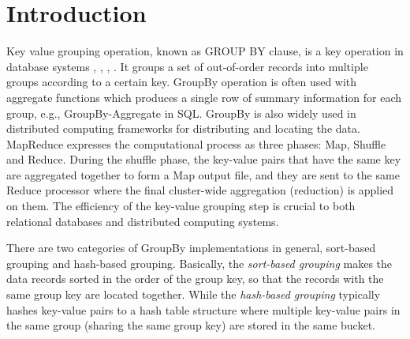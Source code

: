\section{Introduction}

Key value grouping operation, known as GROUP BY clause, is a key operation in database systems \cite{gray1997data}, \cite{stephens2005oracle}, \cite{mysql2009mysql}, \cite{momjian2001postgresql}. It groups a set of out-of-order records into multiple groups according to a certain key. GroupBy operation is often used with aggregate functions which produces a single row of summary information for each group, e.g., GroupBy-Aggregate in SQL. GroupBy is also widely used in distributed computing frameworks for distributing and locating the data. MapReduce \cite{dean2008mapreduce} expresses the computational process as three phases: Map, Shuffle and Reduce. During the shuffle phase, the key-value pairs that have the same key are aggregated together to form a Map output file, and they are sent to the same Reduce processor where the final cluster-wide aggregation (reduction) is applied on them. The efficiency of the key-value grouping step is crucial to both relational databases and distributed computing systems.



There are two categories of GroupBy implementations in general, sort-based grouping and hash-based grouping. Basically, the \emph{sort-based grouping} makes the data records sorted in the order of the group key, so that the records with the same group key are located together. While the \emph{hash-based grouping} typically hashes key-value pairs to a hash table structure where multiple key-value pairs in the same group (sharing the same group key) are stored in the same bucket.

